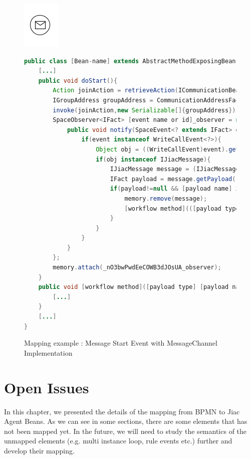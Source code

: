 \begin{figure}[h]
\begin{minipage}[c]{0.28\textwidth}
\includegraphics{images/mapping/message_start.png}
\end{minipage}
\begin{minipage}[c]{0.72\textwidth}
\begin{lstlisting}[language = Java]
public class [Bean-name] extends AbstractMethodExposingBean{
	[...]
	public void doStart(){
		Action joinAction = retrieveAction(ICommunicationBean.ACTION_JOIN_GROUP);
		IGroupAddress groupAddress = CommunicationAddressFactory.createGroupAddress([channel]);
		invoke(joinAction,new Serializable[]{groupAddress});
		SpaceObserver<IFact> [event name or id]_observer = new SpaceObserver<IFact>(){
			public void notify(SpaceEvent<? extends IFact> event) { 
				if(event instanceof WriteCallEvent<?>){
					Object obj = ((WriteCallEvent)event).getObject();
					if(obj instanceof IJiacMessage){ 
						IJiacMessage message = (IJiacMessage)obj;
						IFact payload = message.getPayload();
						if(payload!=null && [payload name] instanceof [payload type] &&  message.getHeader(IJiacMessage.Header.SEND_TO).equalsIgnoreCase([channel]){
							memory.remove(message);
							[workflow method](([payload type])payload);
						}
					}
				}
			}
		};
		memory.attach(_nO3bwPwdEeCOWB3dJOsUA_observer);
	}
	public void [workflow method]([payload type] [payload name]){
		[...]
	}	
	[...]
}
\end{lstlisting}
\end{minipage}
\caption{Mapping example : Message Start Event with MessageChannel Implementation}%
\label{fig:channel_start}
\end{figure}

\newpage
\section{Open Issues}

In this chapter, we presented the details of the mapping from BPMN to Jiac Agent Beans. As we can see in some sections, there are some elements that has not been mapped yet. In the future, we will need to study the semantics of the unmapped elements (e.g. multi instance loop, rule events etc.) further and develop their mapping.

